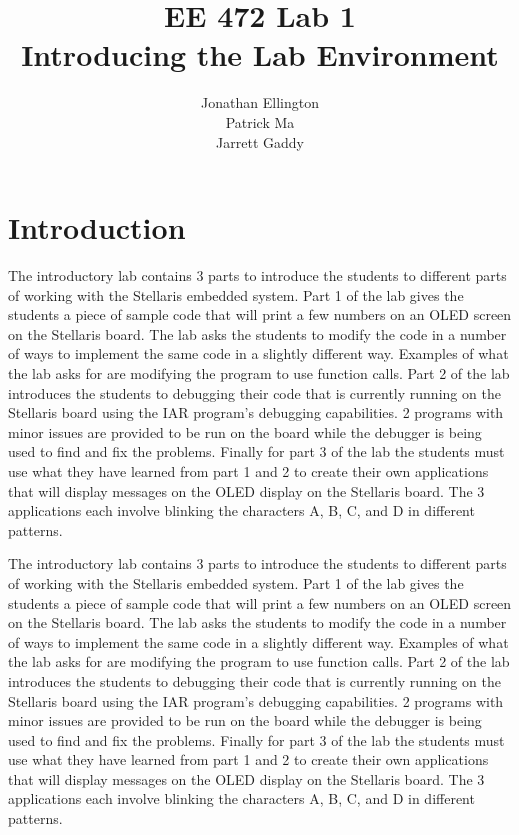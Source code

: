 \documentclass[12pt]{article} %
\title{\TitleFont EE 472 Lab 1 \\ Introducing the Lab Environment \vfill }
\author{\AuthorFont Jonathan Ellington \\ Patrick Ma \\ Jarrett Gaddy}
\date{}
\begin{document}
\maketitle
\thispagestyle{empty}
\pagebreak
\tableofcontents
\listoftables
\listoffigures
\thispagestyle{empty}
\pagebreak
\setcounter{page}{1}

\section{Introduction}

The introductory lab contains 3 parts to introduce the students to different parts of working with the Stellaris embedded system. Part 1 of the lab gives the students a piece of sample code that will print a few numbers on an OLED screen on the Stellaris board. The lab asks the students to modify the code in a number of ways to implement the same code in a slightly different way. Examples of what the lab asks for are modifying the program to use function calls. Part 2 of the lab introduces the students to debugging their code that is currently running on the Stellaris board using the IAR program’s debugging capabilities. 2 programs with minor issues are provided to be run on the board while the debugger is being used to find and fix the problems. Finally for part 3 of the lab the students must use what they have learned from part 1 and 2 to create their own applications that will display messages on the OLED display on the Stellaris board. The 3 applications each involve blinking the characters A, B, C, and D in different patterns.

The introductory lab contains 3 parts to introduce the students to different parts of working with the Stellaris embedded system. Part 1 of the lab gives the students a piece of sample code that will print a few numbers on an OLED screen on the Stellaris board. The lab asks the students to modify the code in a number of ways to implement the same code in a slightly different way. Examples of what the lab asks for are modifying the program to use function calls. Part 2 of the lab introduces the students to debugging their code that is currently running on the Stellaris board using the IAR program’s debugging capabilities. 2 programs with minor issues are provided to be run on the board while the debugger is being used to find and fix the problems. Finally for part 3 of the lab the students must use what they have learned from part 1 and 2 to create their own applications that will display messages on the OLED display on the Stellaris board. The 3 applications each involve blinking the characters A, B, C, and D in different patterns.
\end{document}
